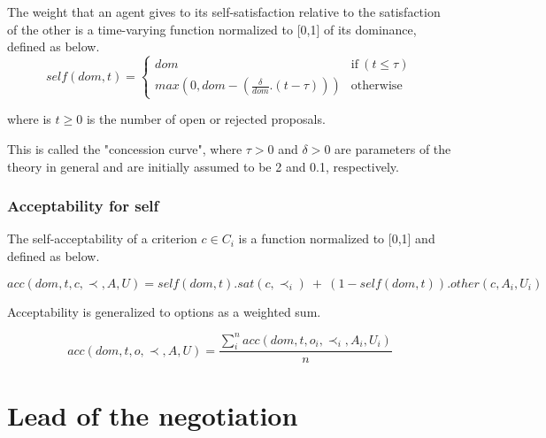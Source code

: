 \documentclass{article}
\begin{document}
	The weight that an agent gives to its self-satisfaction relative to	the satisfaction of the other is a time-varying function normalized to 	[0,1] of its dominance, defined as below.
		$$self(dom, t) = \left\{\begin{array}{ll}
		dom & \mathrm{if\ } (t \leq \tau)\\
		max(0, dom - (\frac{\delta}{dom} . (t - \tau))) & \mathrm{otherwise}
		\end{array}\right.$$
		
	
	where is $t \geq 0$ is the number of open or rejected proposals.
	
	This is called the "concession curve", where $\tau > 0$ and $\delta > 0$
	are parameters of the theory in general and are initially assumed to
	be 2 and 0.1, respectively.
	\subsubsection{Acceptability for self}

	The self-acceptability of a criterion $c \in C_i$ is a function	normalized to [0,1] and defined as below.
	
	$$acc(dom, t, c, \prec, A, U) = self(dom, t) . sat(c, \prec_i) \ +\  (1 - self(dom, t)) . other(c, A_i, U_i)$$
	
	Acceptability is generalized to options as a weighted sum.
	
	$$acc(dom, t, o, \prec, A, U) = \frac{ \sum_{i}^{n} acc(dom, t, o_i, \prec_i, A_i, U_i) } {n}$$ 
	
	
	\section{Lead of the negotiation}
%	
	
%	
%	
%		
	
\end{document}
